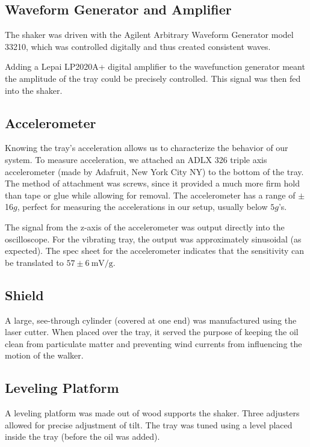 \subsection{Waveform Generator and Amplifier}
    The shaker was driven with the Agilent Arbitrary Waveform Generator model 33210, which was controlled digitally and thus created consistent waves.  
       
    Adding a Lepai LP2020A+ digital amplifier to the wavefunction generator meant the amplitude of the tray could be precisely controlled. This signal was then fed into the shaker.    
            
\subsection{Accelerometer}  
    Knowing the tray's acceleration allows us to characterize the behavior of our system. To measure acceleration, we attached an ADLX 326 triple axis accelerometer (made by Adafruit, New York City NY) to the bottom of the tray. The method of attachment was screws, since it provided a much more firm hold than tape or glue while allowing for removal. The accelerometer has a range of $\pm$16$g$, perfect for measuring the accelerations in our setup, usually below $5g$'s. 
      
      The signal from the z-axis of the accelerometer was output directly into the oscilloscope. For the vibrating tray, the output was approximately sinusoidal (as expected). The spec sheet for the accelerometer indicates that the sensitivity can be translated to $57 \pm 6~\mathrm{mV/g}$. 
 
    
\subsection{Shield}
    A large, see-through cylinder (covered at one end) was manufactured using the laser cutter. When placed over the tray, it served the purpose of keeping the oil clean from particulate matter and preventing wind currents from influencing the motion of the walker.       
   
\subsection{Leveling Platform}
    A leveling platform was made out of wood supports the shaker. Three adjusters allowed for precise adjustment of tilt. The tray was tuned using a level placed inside the tray (before the oil was added). 

